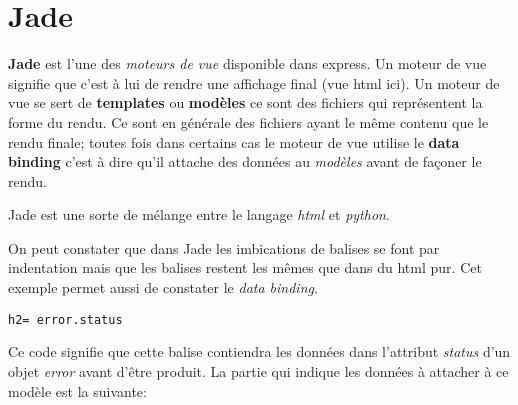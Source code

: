 \section{Jade}
\textbf{Jade} est l'une des \textit{moteurs de vue} disponible dans express. Un moteur de vue signifie que c'est à lui de rendre une affichage final (vue html ici). Un moteur de vue se sert de \textbf{templates} ou \textbf{modèles} ce sont des fichiers qui représentent la forme du rendu. Ce sont en générale des fichiers ayant le même contenu que le rendu finale; toutes fois dans certains cas le moteur de vue utilise le \textbf{data binding} c'est à dire qu'il attache des données au \textit{modèles} avant de façoner le rendu.

Jade est une sorte de mélange entre le langage \textit{html} et \textit{python}.

On peut constater que dans Jade les imbications de balises se font par indentation mais que les balises restent les mêmes que dans du html pur. Cet exemple permet aussi de constater le \textit{data binding}.
\begin{lstlisting}[style=htmlcssjs]
	h2= error.status
\end{lstlisting}
Ce code signifie que cette balise contiendra les données dans l'attribut \textit{status} d'un objet \textit{error} avant d'être produit.
La partie qui indique les données à attacher à ce modèle est la suivante:

